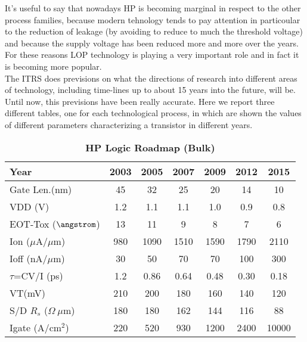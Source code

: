 \documentclass[a4paper, 12pt, twoside, openright]{report}
\begin{document}
It's useful to say that nowadays HP is becoming marginal in respect to the other process families, because modern tehnology tends to pay attention in particoular to the reduction of leakage (by avoiding to reduce to much the threshold voltage) and because the supply voltage has been reduced more and more over the years. For these reasons LOP technology is playing a very important role and in fact it is becoming more popular. \\ The ITRS does previsions on what the directions of research into different areas of technology, including time-lines up to about 15 years into the future, will be. Until now, this previsions have been really accurate.
Here we report three different tables, one for each technological process, in which are shown the values of different parameters characterizing a transistor in different years.\\



 
   \begin{table}[h]
   \centering
     \begin{tabular}{||l||c|c|c|c|c|c||}\hline
      Year          & 2003 & 2005 & 2007 & 2009 & 2012 & 2015\\
      \hline
             
      Gate Len.(nm)  &45 &32 &25  &20  &14  &10\\ %
      \hline
      VDD (V)  &1.2  &1.1 &1.1 &1.0 &0.9 &0.8\\
      \hline
      EOT-Tox ($\angstrom$) &13 &11 &9 &8 &7 &6\\
      \hline
      {Ion} ($\mu$A/$\mu$m)  &980  &1090 &1510 &1590 &1790 &2110\\
      \hline
      {Ioff} (nA/$\mu$m)  &30 &50 &70 &70  &100  &300\\
      \hline
      {$\tau$=CV/I} (ps)  &1.2 &0.86 &0.64 &0.48 &0.30 &0.18\\
      \hline
      VT(mV)   &210  &200 &180 &160 &140 &120\\
      \hline
      S/D $R_s$ ($\Omega~\mu$m)   &180 &180 &162 &144 &116 &88\\
      \hline
      Igate (A/cm$^2$)   &220 &520 &930 &1200 &2400 &10000\\
      \hline
     \end{tabular}
     \caption{\textbf{HP Logic Roadmap (Bulk)}}
   \end{table}
\end{document}
